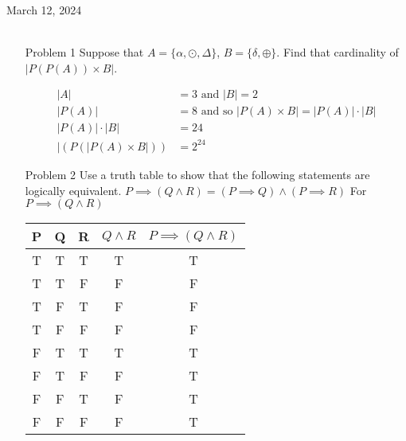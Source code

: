 \documentclass[12pt, oneside]{article}
\begin{document}
\begin{flushleft}
\end{flushleft}
March 12, 2024\\\\
\begin{itemize}
    \item[Problem 1] Suppose that \(A = \{\alpha, \odot, \Delta\}\), \(B = \{\delta, \oplus\}\). Find that cardinality of \(|P(P(A)) \times B|\).

          \begin{align*}
              |A|                   & = 3 \text{ and }  |B| = 2                           \\
              |P(A)|                & = 8\text{ and so } |P(A) \times B| = |P(A)|\cdot|B| \\
              |P(A)|\cdot|B|        & = 24                                                \\
              |(P(|P(A) \times B|)) & =  2^{24}
          \end{align*}
    \item[Problem 2] Use a truth table to show that the following statements are logically equivalent. \(P \implies (Q \wedge R) = (P \implies Q) \wedge (P \implies R)\)
          For \(P \implies (Q \wedge R) \)
          \begin{center}
              \begin{tabular}{ c|c|c|c|c}
                  P & Q & R & \(Q \wedge R\) & \(P \implies (Q \wedge R)\) \\
                  \hline
                  T & T & T & T              & T                           \\
                  T & T & F & F              & F                           \\
                  T & F & T & F              & F                           \\
                  T & F & F & F              & F                           \\
                  F & T & T & T              & T                           \\
                  F & T & F & F              & T                           \\
                  F & F & T & F              & T                           \\
                  F & F & F & F              & T                           \\

\end{tabular}
\end{center}
\end{itemize}
\end{document}
